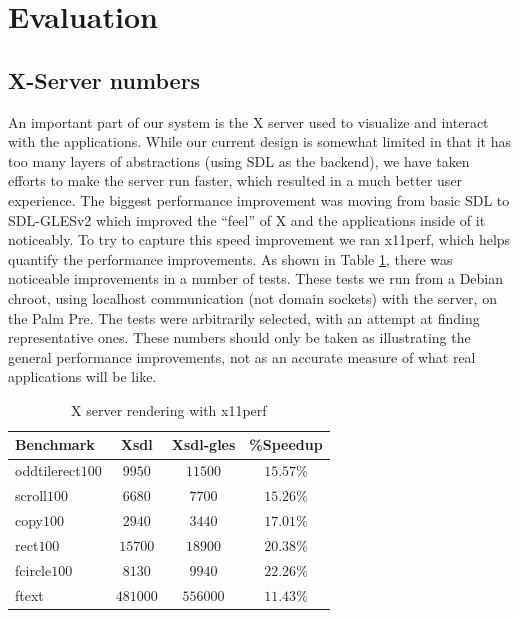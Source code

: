 \section{Evaluation}
\label{sec:eval}

\subsection{X-Server numbers}
\label{sec:x_eval}

An important part of our system is the X server used to visualize and interact with the applications.  While our current design is somewhat limited in that it has too many layers of abstractions (using SDL as the backend), we have taken efforts to make the server run faster, which resulted in a much better user experience.  The biggest  performance improvement was moving from basic SDL to SDL-GLESv2 which improved the ``feel'' of X and the applications inside of it noticeably.  To try to capture this speed improvement we ran x11perf, which helps quantify the performance improvements.  As shown in Table \ref{tab:x_results}, there was noticeable improvements in a number of tests.
These tests we run from a Debian chroot, using localhost communication (not domain sockets) with the server, on the Palm Pre.  The tests were arbitrarily selected, with an attempt at finding representative ones.  These numbers should only be taken as illustrating the general performance improvements, not as an accurate measure of what real applications will be like.

\begin{table}[ht]
{\small
\hfill{}
\begin{tabular}{|l|c|c|c|}
\hline Benchmark & Xsdl & Xsdl-gles & \%Speedup \\ [2pt] 
\hline oddtilerect$100$ & $9950$ & $11500$ & $15.57\%$ \\ [2pt]
scroll$100$ & $6680$ & $7700$ & $15.26\%$ \\ [2pt]
copy$100$ & $2940$ & $3440$ & $17.01\%$ \\ [2pt]
rect$100$ & $15700$ & $18900$ & $20.38\%$ \\ [2pt]
fcircle$100$ & $8130$ & $9940$ & $22.26\%$ \\ [2pt]
ftext & $481000$ & $556000$ & $11.43\%$ \\ [2pt]
\hline 
\end{tabular}}
\hfill{}
\caption{ X server rendering with x11perf }
\label{tab:x_results}
\end{table}

